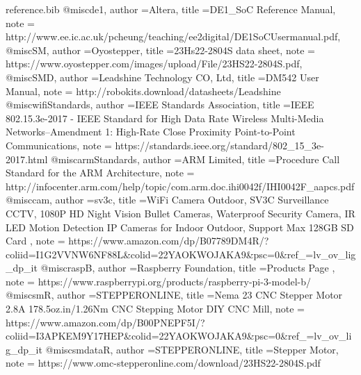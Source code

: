 %
\RequirePackage{filecontents}
\begin{filecontents*}{reference.bib}
	@misc{de1,
	author			={Altera},
	title			={{DE1\_SoC Reference Manual}},
	note			=	{http://www.ee.ic.ac.uk/pcheung/teaching/ee2digital/DE1SoCUsermanual.pdf,
	}
}
	@misc{SM,
	author			={Oyostepper},
	title			={{23Hs22-2804S data sheet}},
	note			=	{https://www.oyostepper.com/images/upload/File/23HS22-2804S.pdf,
	}
}
	@misc{SMD,
	author			={Leadshine Technology CO, Ltd},
	title			={{DM542 User Manual}},
	note			=	{http://robokits.download/datasheets/Leadshine%
	}
}
	@misc{wifiStandards,
	author			={IEEE Standards Association},
	title			={{IEEE 802.15.3e-2017 - IEEE Standard for 
					High Data Rate Wireless Multi-Media Networks--Amendment 1: High-Rate Close Proximity Point-to-Point Communications}},
	note			=	{https://standards.ieee.org/standard/802\_15\_3e-2017.html
	}
}
	@misc{armStandards,
	author			={ARM Limited},
	title			={{Procedure Call Standard for the 
					ARM Architecture}},
	note			=	{http://infocenter.arm.com/help/topic/com.arm.doc.ihi0042f/IHI0042F\_aapcs.pdf
	}
}
	@misc{cam,
	author			={sv3c},
	title			={{WiFi Camera Outdoor, SV3C 
					Surveillance CCTV, 1080P HD Night 
					Vision Bullet Cameras, Waterproof 
					Security Camera, IR LED Motion Detection 
					IP Cameras for Indoor Outdoor, Support Max 
					128GB SD Card }},
	note			=	{https://www.amazon.com/dp/B07789DM4R/?coliid=I1G2VVNW6NF88L\&colid=22YAOKWOJAKA9\&psc=0\&ref\_=lv\_ov\_lig\_dp\_it
	}
}
	@misc{raspB,
	author			={Raspberry Foundation},
	title			={{Products Page }},
	note			=	{https://www.raspberrypi.org/products/raspberry-pi-3-model-b/
	}
}
	@misc{smR,
	author			={STEPPERONLINE},
	title			={{Nema 23 CNC Stepper Motor 
					2.8A 178.5oz.in/1.26Nm CNC Stepping Motor DIY CNC Mill}},
	note			=	{https://www.amazon.com/dp/B00PNEPF5I/?coliid=I3APKEM9Y17HEP\&colid=22YAOKWOJAKA9\&psc=0\&ref\_=lv\_ov\_lig\_dp\_it
	}
}
	@misc{smdataR,
	author			={STEPPERONLINE},
	title			={{Stepper Motor}},
	note			=	{https://www.omc-stepperonline.com/download/23HS22-2804S.pdf
	}
}
\end{filecontents*}

\documentclass[12pt,onecolumn]{IEEEtran}			%
\usepackage{dtk-logos}						%
\usepackage{graphics}
\usepackage{float}
\usepackage{caption} 
\usepackage[export]{adjustbox}

